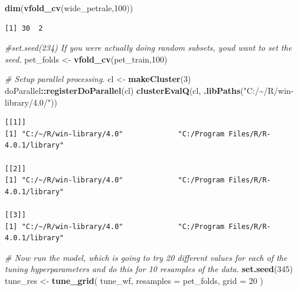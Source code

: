 \documentclass[
]{article}
\newenvironment{Shaded}{\begin{snugshade}}{\end{snugshade}}
\newcommand{\CommentTok}[1]{\textcolor[rgb]{0.56,0.35,0.01}{\textit{#1}}}
\newcommand{\DataTypeTok}[1]{\textcolor[rgb]{0.13,0.29,0.53}{#1}}
\newcommand{\DecValTok}[1]{\textcolor[rgb]{0.00,0.00,0.81}{#1}}
\newcommand{\KeywordTok}[1]{\textcolor[rgb]{0.13,0.29,0.53}{\textbf{#1}}}
\newcommand{\NormalTok}[1]{#1}
\newcommand{\OperatorTok}[1]{\textcolor[rgb]{0.81,0.36,0.00}{\textbf{#1}}}
\newcommand{\StringTok}[1]{\textcolor[rgb]{0.31,0.60,0.02}{#1}}
\begin{document}
\begin{Shaded}
\begin{Highlighting}[]
\KeywordTok{dim}\NormalTok{(}\KeywordTok{vfold\_cv}\NormalTok{(wide\_petrale,}\DecValTok{100}\NormalTok{))}
\end{Highlighting}
\end{Shaded}

\begin{verbatim}
[1] 30  2
\end{verbatim}

\begin{Shaded}
\begin{Highlighting}[]
\CommentTok{\#set.seed(234) If you were actually doing random subsets, you\textquotesingle{}d want to set the seed.}
\NormalTok{pet\_folds <{-}}\StringTok{ }\KeywordTok{vfold\_cv}\NormalTok{(pet\_train,}\DecValTok{100}\NormalTok{)}

\CommentTok{\#  Setup parallel processing.}
\NormalTok{cl <{-}}\StringTok{ }\KeywordTok{makeCluster}\NormalTok{(}\DecValTok{3}\NormalTok{)}
\NormalTok{doParallel}\OperatorTok{::}\KeywordTok{registerDoParallel}\NormalTok{(cl)}
\KeywordTok{clusterEvalQ}\NormalTok{(cl, }\KeywordTok{.libPaths}\NormalTok{(}\StringTok{"C:/\textasciitilde{}/R/win{-}library/4.0/"}\NormalTok{))}
\end{Highlighting}
\end{Shaded}

\begin{verbatim}
[[1]]
[1] "C:/~/R/win-library/4.0"             "C:/Program Files/R/R-4.0.1/library"

[[2]]
[1] "C:/~/R/win-library/4.0"             "C:/Program Files/R/R-4.0.1/library"

[[3]]
[1] "C:/~/R/win-library/4.0"             "C:/Program Files/R/R-4.0.1/library"
\end{verbatim}

\begin{Shaded}
\begin{Highlighting}[]
\CommentTok{\#  Now run the model, which is going to try 20 different values for each of the tuning hyperparameters and do this for 10 resamples of the data.}
\KeywordTok{set.seed}\NormalTok{(}\DecValTok{345}\NormalTok{)}
\NormalTok{tune\_res <{-}}\StringTok{ }\KeywordTok{tune\_grid}\NormalTok{(}
\NormalTok{  tune\_wf,}
  \DataTypeTok{resamples =}\NormalTok{ pet\_folds,}
  \DataTypeTok{grid =} \DecValTok{20}
\NormalTok{)}
\end{Highlighting}
\end{Shaded}
\end{document}
